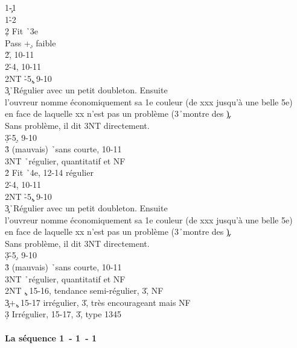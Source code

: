 \documentclass[a4paper]{article}
\begin{document}
\begin{bidtable}
1\c-1\d\\
1\h-2\c\\
2\d \> Fit \h\ 3e\+\\
Pass +\d , faible\\
2\h {}\h , 10-11\\
2\s {}\h -4\s , 10-11\\
2NT \h -5\c , 9-10\\
3\c {}\h\ Régulier avec un petit doubleton. Ensuite\+\\
l'ouvreur \> nomme économiquement sa 1e couleur (de xxx jusqu'à une belle 5e)\\
en \> face de laquelle xx n'est pas un problème (3\h\ montre des \c ).\\
Sans \> problème, il dit 3NT directement.\-\\
3\d {}\h -5\d , 9-10\\
3\h {} (mauvais) \h\ sans courte, 10-11\\
3NT \h\ régulier, quantitatif et NF\-\\
2\h \> Fit \h\ 4e, 12-14 régulier\+\\
2\s {}\h -4\s , 10-11\\
2NT \h -5\c , 9-10\\
3\c {}\h\ Régulier avec un petit doubleton. Ensuite\+\\
l'ouvreur \> nomme économiquement sa 1e couleur (de xxx jusqu'à une belle 5e)\\
en \> face de laquelle xx n'est pas un problème (3\h\ montre des \c ).\\
Sans \> problème, il dit 3NT directement.\-\\
3\d {}\h -5\d , 9-10\\
3\h {} (mauvais) \h\ sans courte, 10-11\\
3NT \h\ régulier, quantitatif et NF\-\\
2NT \c , 15-16, tendance semi-régulier, 3\h , NF\\
3\c {}+\c , 15-17 irrégulier, 3\h , très encourageant mais NF\\
3\d \> Irrégulier, 15-17, 3\h , type 1345
\end{bidtable}

\paragraph{La séquence 1\pdfc\ - 1\pdfd\ - 1\pdfs}
\end{document}
